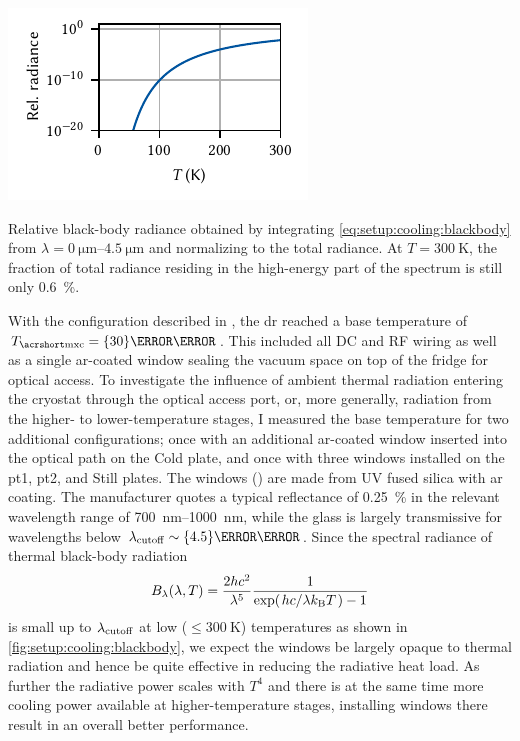\begin{marginfigure}
    \centering
    \includegraphics{img/pdf/setup/black_body_radiance}
    \caption[]{
        Relative black-body radiance obtained by integrating \cref{eq:setup:cooling:blackbody} from $\lambda = \qtyrange{0}{4.5}{\micro\meter}$ and normalizing to the total radiance.
        At $T=\qty{300}{\kelvin}$, the fraction of total radiance residing in the high-energy part of the spectrum is still only \qty{0.6}{\percent}.
    }
    \label{fig:setup:cooling:blackbody}
\end{marginfigure}

With the configuration described in , the \gls{dr} reached a base temperature of $\Tmxc = \qty{30}{\milli\kelvin}$.
This included all DC and RF wiring as well as a single \gls{ar}-coated window sealing the vacuum space on top of the fridge for optical access.
To investigate the influence of ambient thermal radiation entering the cryostat through the optical access port, or, more generally, radiation from the higher- to lower-temperature stages, I measured the base temperature for two additional configurations; once with an additional \gls{ar}-coated window inserted into the optical path on the Cold plate, and once with three windows installed on the \gls{pt1}, \gls{pt2}, and Still plates.
The windows (\thewindow) are made from UV fused silica with \gls{ar} coating.
The manufacturer quotes a typical reflectance of \qty{0.25}{\percent} in the relevant wavelength range of \qtyrange{700}{1000}{\nano\meter}, while the glass is largely transmissive for wavelengths below $\lambda_{\mr{cutoff}}\sim\qty{4.5}{\micro\meter}$.
Since the spectral radiance of thermal black-body radiation~\cite{Planck1900}
\begin{equation}\label{eq:setup:cooling:blackbody}
    B_\lambda(\lambda, T) = \frac{2 h c^2}{\lambda^5}\frac{1}{\exp(\flatfrac{hc}{\lambda\kb T}) - 1}
\end{equation}
is small up to $\lambda_{\mathrm{cutoff}}$ at low ($\leq\qty{300}{\kelvin}$) temperatures as shown in \cref{fig:setup:cooling:blackbody}, we expect the windows be largely opaque to thermal radiation and hence be quite effective in reducing the radiative heat load.
As further the radiative power scales with $T^4$ and there is at the same time more cooling power available at higher-temperature stages, installing windows there result in an overall better performance.


